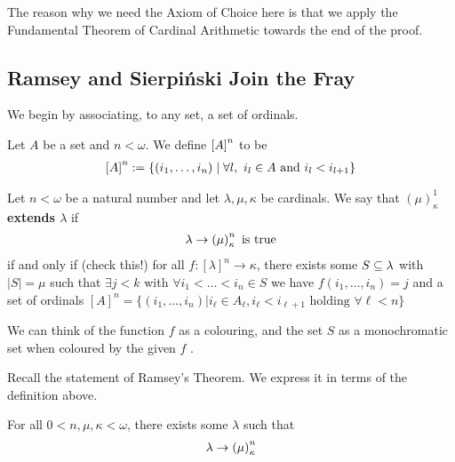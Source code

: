 The reason why we need the Axiom of Choice here is that we apply the Fundamental Theorem of Cardinal Arithmetic towards the end of the proof.

\subsection{Ramsey and Sierpiński Join the Fray}

We begin by associating, to any set, a set of ordinals.

\begin{boxdefinition}
    Let $A$ be a set and $n < \omega$. We define $\left[ A \right]^n$ to be
    \begin{align*}
        \brac{A}^n := \setst{\parenth{i_1, \ldots, i_n}}{\forall l, \ i_l \in A \text{ and } i_l < i_{l+1}}
    \end{align*}
\end{boxdefinition}

\begin{boxdefinition}
    Let $n < \omega$ be a natural number and let $\lambda, \mu, \kappa$ be cardinals. We say that \textbf{$(\mu)_{\kappa}^{1}$ extends $\lambda$} if
    \begin{align*}
        \lambda \to \left( \mu \right)_{\kappa}^n \text{ is true}
    \end{align*}
    if and only if (check this!) for all $f:[\lambda]^n\to \kappa$, there exists some $S\subseteq \lambda$ with $|S|=\mu$ such that $\exists j<k$ with $\forall i_1<\ldots <i_n\in S$ we have $f(i_1,\ldots, i_n)=j$ and a set of ordinals $[A]^n=\{(i_1, \ldots, i_n)|i_{\ell}\in A_{\ell}, i_{\ell}<i_{\ell+1}\text{ holding }\forall \ell<n\}$
\end{boxdefinition}
\begin{remark}
    We can think of the function $f$ as a colouring, and the set $S$ as a monochromatic set when coloured by the given $f$ \sorry.
\end{remark}



Recall the statement of Ramsey's Theorem. We express it in terms of the definition above.

\begin{boxtheorem}
    For all $0 < n, \mu, \kappa < \omega$, there exists some $\lambda$ such that
    \begin{align*}
        \lambda \to \left( \mu \right)_{\kappa}^{n}
    \end{align*}
\end{boxtheorem}

